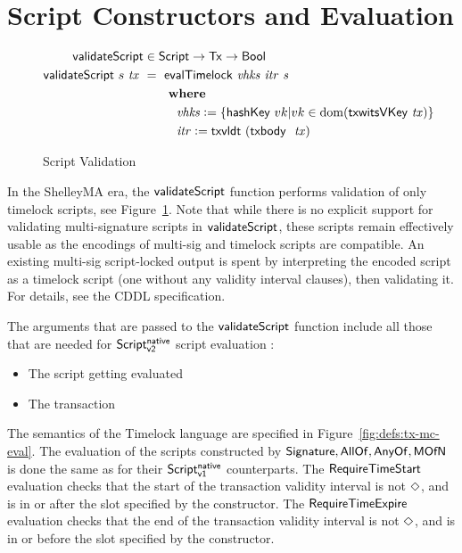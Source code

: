 \section{Script Constructors and Evaluation}
\label{sec:timelock-lang}


\begin{figure}[htb]
  \begin{align*}
    \mathsf{validateScript} & \in\mathsf{Script}\to\mathsf{Tx}\to\mathsf{Bool} \\
    \mathsf{validateScript} ~s~\mathit{tx}~& =~
                             \mathsf{evalTimelock}~\mathit{vhks} ~\mathit{itr}~\mathit{s} \\
                         & ~~~~~ ~ \mathbf{where}~ ~  \\
                         & ~~~~~~~~\mathit{vhks}\mathrel{\mathop:}= \{\mathsf{hashKey}~vk \vert
                           vk \in \operatorname{dom}(\mathsf{txwitsVKey}~\mathit{tx})\} \\
                         & ~~~~~~~~\mathit{itr} \mathrel{\mathop:}= \mathsf{txvldt}~ (\mathsf{txbody}~ \mathit{~} \mathit{tx})
  \end{align*}
  \caption{Script Validation}
  \label{fig:functions-validate}
\end{figure}

In the ShelleyMA era, the
$\mathsf{validateScript}$ function performs validation of only timelock scripts,
see Figure~\ref{fig:functions-validate}. Note that while there is no explicit
support for validating multi-signature scripts in $\mathsf{validateScript}$,
these scripts remain effectively usable as the encodings of multi-sig and timelock
scripts are compatible. An existing multi-sig script-locked output is
spent by interpreting the encoded script as a timelock script (one without
any validity interval clauses), then validating it. For details, see the CDDL
specification.

The arguments that are passed to the $\mathsf{validateScript}$ function include all those
that are needed for $\mathsf{Script^{native}_{v2}}$ script evaluation :

\begin{itemize}
\item The script getting evaluated
\item The transaction
\end{itemize}

The semantics of the Timelock language are specified in Figure~\ref{fig:defs:tx-mc-eval}.
The evaluation of the scripts constructed by $\mathsf{Signature}, \mathsf{AllOf},
\mathsf{AnyOf}, \mathsf{MOfN}$ is done the same as for their
$\mathsf{Script^{native}_{v1}}$ counterparts. The $\mathsf{RequireTimeStart}$ evaluation
checks that the start of the transaction validity interval is not $\Diamond$, and is in or after
the slot specified by the constructor. The $\mathsf{RequireTimeExpire}$ evaluation
checks that the end of the transaction validity interval is not $\Diamond$, and is in or before
the slot specified by the constructor.


